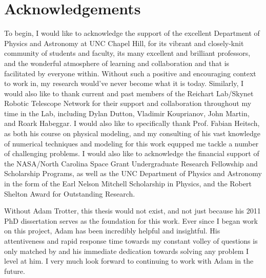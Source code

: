 \chapter*{Acknowledgements}
\label{cha:section_acknowledgements}
To begin, I would like to acknowledge the support of the excellent Department of Physics and Astronomy at UNC Chapel Hill, for its vibrant and closely-knit community of students and faculty, its many excellent and brilliant professors, and the wonderful atmosphere of learning and collaboration and that is facilitated by everyone within. Without such a positive and encouraging context to work in, my research would've never become what it is today. Similarly, I would also like to thank current and past members of the Reichart Lab/Skynet Robotic Telescope Network for their support and collaboration throughout my time in the Lab, including Dylan Dutton, Vladimir Kouprianov, John Martin, and Roark Habeggar. I would also like to specifically thank Prof. Fabian Heitsch, as both his course on physical modeling, and my consulting of his vast knowledge of numerical techniques and modeling for this work equpped me tackle a number of challenging problems. I would also like to acknowledge the financial support of the NASA/North Carolina Space Grant Undergraduate Research Fellowship and Scholarship Programs, as well as the UNC Department of Physics and Astronomy in the form of the Earl Nelson Mitchell Scholarship in Physics, and the Robert Shelton Award for Outstanding Research.



Without Adam Trotter, this thesis would not exist, and not just because his 2011 PhD dissertation serves as the foundation for this work. Ever since I began work on this project, Adam has been incredibly helpful and insightful. His attentiveness and rapid response time towards my constant volley of questions is only matched by and his immediate dedication towards solving any problem I level at him. I very much look forward to continuing to work with Adam in the future.

